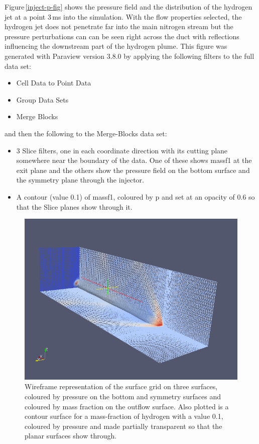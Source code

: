 Figure\,\ref{inject-p-fig} shows the pressure field and the distribution of the hydrogen
jet at a point 3\,ms into the simulation.
With the flow properties selected, the hydrogen jet does not penetrate far
into the main nitrogen stream but the pressure perturbations can can be seen
right across the duct with reflections influencing the downstream part of the hydrogen plume.
This figure was generated with Paraview version 3.8.0 by applying the following filters to the 
full data set:
\begin{itemize}
 \item Cell Data to Point Data
 \item Group Data Sets
 \item Merge Blocks
\end{itemize}
and then the following to the Merge-Blocks data set:
\begin{itemize}
 \item 3 Slice filters, one in each coordinate direction with its cutting plane 
       somewhere near the boundary of the data.  One of these shows massf1 at the exit plane
       and the others show the pressure field on the bottom surface and the symmetry plane through
       the injector.
 \item A contour (value 0.1) of massf1, coloured by p and set at an opacity of 0.6 so that
       the Slice planes show through it.
\end{itemize}


\begin{figure}[htbp]
\begin{center}
\includegraphics[width=12cm]{../3D/inject-1/inject-p-mesh-on-walls-with-massf1-contour.png}
\end{center}
\caption{Wireframe representation of the surface grid on three surfaces, coloured by pressure on the bottom 
  and symmetry surfaces and coloured by mass fraction on the outflow surface.
  Also plotted is a contour surface for a mass-fraction of hydrogen with a value 0.1, coloured by pressure
  and made partially transparent so that the planar surfaces show through.}
\label{inject-wireframe-fig}
\end{figure}

